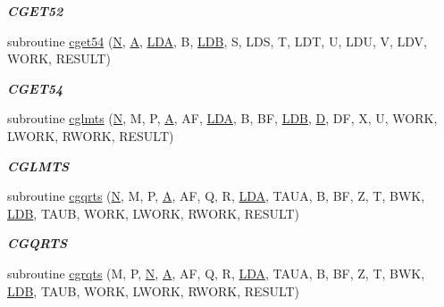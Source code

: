\begin{DoxyCompactItemize}
\begin{DoxyCompactList}\small\item\em {\bfseries C\+G\+E\+T52} \end{DoxyCompactList}\item 
subroutine \hyperlink{group__complex__eig_gafbfe7ec0c6aeaf712ca2c79001146e4b}{cget54} (\hyperlink{polmisc_8c_a0240ac851181b84ac374872dc5434ee4}{N}, \hyperlink{classA}{A}, \hyperlink{example__user_8c_ae946da542ce0db94dced19b2ecefd1aa}{L\+D\+A}, B, \hyperlink{example__user_8c_a50e90a7104df172b5a89a06c47fcca04}{L\+D\+B}, S, L\+D\+S, T, L\+D\+T, U, L\+D\+U, V, L\+D\+V, W\+O\+R\+K, R\+E\+S\+U\+L\+T)
\begin{DoxyCompactList}\small\item\em {\bfseries C\+G\+E\+T54} \end{DoxyCompactList}\item 
subroutine \hyperlink{group__complex__eig_ga4283cb04f906b24363d97745e2ce10bd}{cglmts} (\hyperlink{polmisc_8c_a0240ac851181b84ac374872dc5434ee4}{N}, M, P, \hyperlink{classA}{A}, A\+F, \hyperlink{example__user_8c_ae946da542ce0db94dced19b2ecefd1aa}{L\+D\+A}, B, B\+F, \hyperlink{example__user_8c_a50e90a7104df172b5a89a06c47fcca04}{L\+D\+B}, \hyperlink{odrpack_8h_a7dae6ea403d00f3687f24a874e67d139}{D}, D\+F, X, U, W\+O\+R\+K, L\+W\+O\+R\+K, R\+W\+O\+R\+K, R\+E\+S\+U\+L\+T)
\begin{DoxyCompactList}\small\item\em {\bfseries C\+G\+L\+M\+T\+S} \end{DoxyCompactList}\item 
subroutine \hyperlink{group__complex__eig_ga28909ffc04948989e0c6bf3dedaed598}{cgqrts} (\hyperlink{polmisc_8c_a0240ac851181b84ac374872dc5434ee4}{N}, M, P, \hyperlink{classA}{A}, A\+F, Q, R, \hyperlink{example__user_8c_ae946da542ce0db94dced19b2ecefd1aa}{L\+D\+A}, T\+A\+U\+A, B, B\+F, Z, T, B\+W\+K, \hyperlink{example__user_8c_a50e90a7104df172b5a89a06c47fcca04}{L\+D\+B}, T\+A\+U\+B, W\+O\+R\+K, L\+W\+O\+R\+K, R\+W\+O\+R\+K, R\+E\+S\+U\+L\+T)
\begin{DoxyCompactList}\small\item\em {\bfseries C\+G\+Q\+R\+T\+S} \end{DoxyCompactList}\item 
subroutine \hyperlink{group__complex__eig_gabe5f303c97976c8ca2871a3a253e2113}{cgrqts} (M, P, \hyperlink{polmisc_8c_a0240ac851181b84ac374872dc5434ee4}{N}, \hyperlink{classA}{A}, A\+F, Q, R, \hyperlink{example__user_8c_ae946da542ce0db94dced19b2ecefd1aa}{L\+D\+A}, T\+A\+U\+A, B, B\+F, Z, T, B\+W\+K, \hyperlink{example__user_8c_a50e90a7104df172b5a89a06c47fcca04}{L\+D\+B}, T\+A\+U\+B, W\+O\+R\+K, L\+W\+O\+R\+K, R\+W\+O\+R\+K, R\+E\+S\+U\+L\+T)

\end{DoxyCompactItemize}
